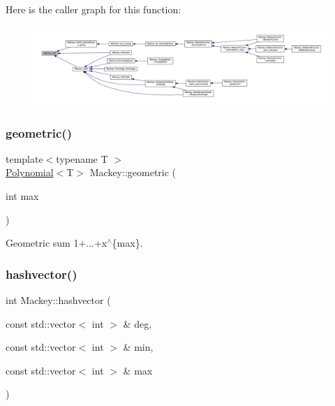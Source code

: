 Here is the caller graph for this function\+:\nopagebreak
\begin{figure}[H]
\begin{center}
\leavevmode
\includegraphics[width=350pt]{namespaceMackey_a9c9c2faea24be988cdfcd773360134be_icgraph}
\end{center}
\end{figure}
\mbox{\label{namespaceMackey_a2b9319a9af0a3cad8cfec47e9197dc82}} 
\subsubsection{\texorpdfstring{geometric()}{geometric()}}
{\footnotesize\ttfamily template$<$typename T $>$ \\
\hyperlink{classMackey_1_1Polynomial}{Polynomial}$<$T$>$ Mackey\+::geometric (\begin{DoxyParamCaption}\item[{int}]{max }\end{DoxyParamCaption})}



Geometric sum 1+...+x$^\wedge$\{max\}. 

\mbox{\label{namespaceMackey_ae57418329a761aa68d26d68b637fe9dd}} 
\subsubsection{\texorpdfstring{hashvector()}{hashvector()}}
{\footnotesize\ttfamily int Mackey\+::hashvector (\begin{DoxyParamCaption}\item[{const std\+::vector$<$ int $>$ \&}]{deg,  }\item[{const std\+::vector$<$ int $>$ \&}]{min,  }\item[{const std\+::vector$<$ int $>$ \&}]{max }\end{DoxyParamCaption})}



